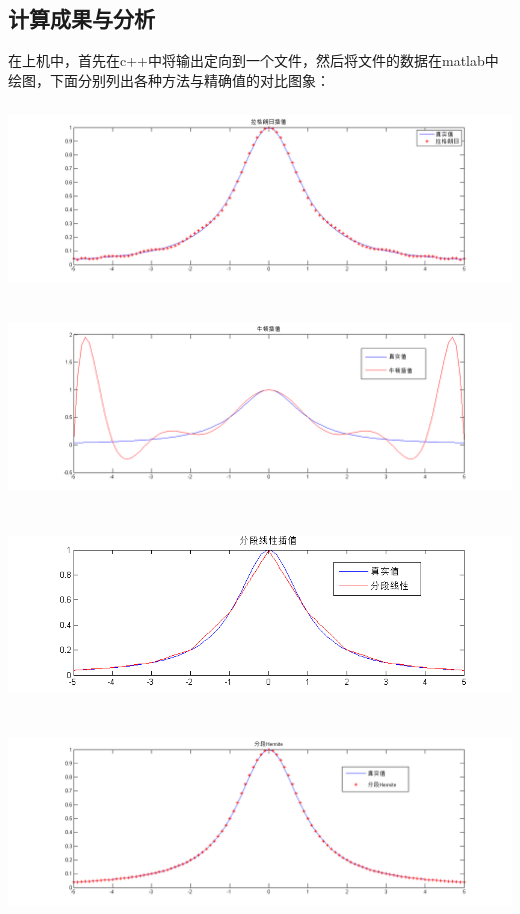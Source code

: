 \documentclass[10pt,a4paper]{ctexart}
\begin{document}
\subsection{计算成果与分析}
在上机中，首先在c++中将输出定向到一个文件，然后将文件的数据在matlab中绘图，下面分别列出各种方法与精确值的对比图象：
\par
\centerline{\includegraphics[height=5cm,width=18cm]{Lagrange.png}}
\centerline{\includegraphics[height=5cm,width=18cm]{newton.png}}
\centerline{\includegraphics[height=5cm,width=18cm]{分段线性插值.png}}
\centerline{\includegraphics[height=5cm,width=18cm]{Hermite.png}}
\end{document}
